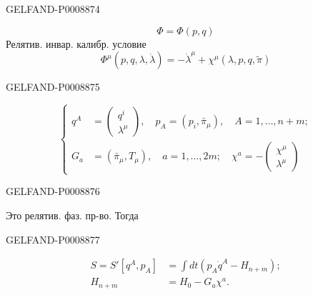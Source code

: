 \begin{GelfandAdjacentEvidence}{GELFAND-P000887}{4}

\begin{equation*}
\Phi=\Phi(p,q)
\end{equation*}
Релятив. инвар. калибр. условие
\begin{equation*}
\Phi^\mu(p,q,\lambda,\dot\lambda)=-\dot\lambda^\mu+\chi^\mu(\lambda,p,q,\tilde\pi)
\tag{5}
\end{equation*}
\end{GelfandAdjacentEvidence}
\begin{GelfandAdjacentEvidence}{GELFAND-P000887}{5}

\begin{equation*}
\left\{\begin{aligned}
q^A&=\begin{pmatrix}q^i\\\lambda^\mu\end{pmatrix},\quad p_A=(p_i,\bar\pi_\mu),\quad A=1,\ldots,n+m;\\
G_a&=(\bar\pi_\mu,T_\mu),\quad a=1,\ldots,2m;\quad\chi^a=-\begin{pmatrix}\chi^\mu\\\lambda^\mu\end{pmatrix}
\end{aligned}\right.
\tag{6}
\end{equation*}
\end{GelfandAdjacentEvidence}
\begin{GelfandAdjacentEvidence}{GELFAND-P000887}{6}


Это релятив. фаз. пр-во. Тогда
\end{GelfandAdjacentEvidence}
\begin{GelfandAdjacentEvidence}{GELFAND-P000887}{7}

\begin{equation*}
\begin{aligned}
S=S'[q^A,p_A]&=\int dt(p_A\dot q^A-H_{n+m});\\
H_{n+m}&=H_0-G_a\chi^a.
\end{aligned}
\tag{7}
\end{equation*}
\end{GelfandAdjacentEvidence}
